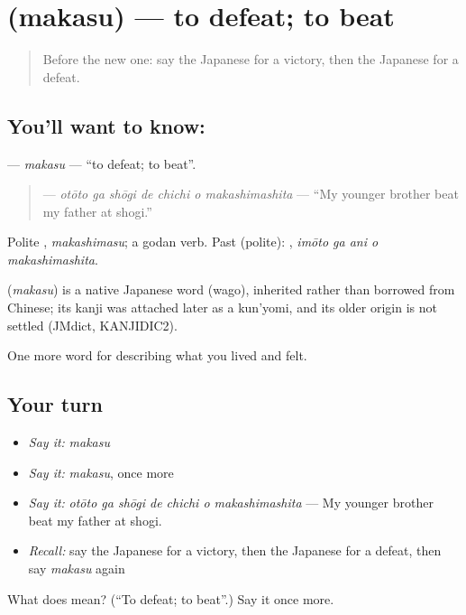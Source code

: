 \section[\texorpdfstring{\ja{まかす} (makasu)}{まかす (makasu)}]{ (makasu) — to defeat; to beat}

\label{lesson:JA-C506-makasu}



\begin{quote}
Before the new one: say the Japanese for a victory, then the Japanese for a defeat.
\end{quote}

\subsection*{You'll want to know: }
\textbf{} — \emph{makasu} — \textquotedblleft{}to defeat; to beat\textquotedblright{}.

\begin{quote}
\textbf{   } — \emph{otōto ga shōgi de chichi o makashimashita} — \textquotedblleft{}My younger brother beat my father at shogi.\textquotedblright{}
\end{quote}

Polite \textbf{}, \emph{makashimasu}; a godan verb. Past (polite): \textbf{  }, \emph{imōto ga ani o makashimashita}.

\begin{cousinweb}
\textbf{} (\emph{makasu}) is a native Japanese word (wago), inherited rather than borrowed from Chinese; its kanji was attached later as a kun'yomi, and its older origin is not settled (JMdict, KANJIDIC2).
\end{cousinweb}

\begin{grammarlens}[title={What you've built}]
One more word for describing what you lived and felt.
\end{grammarlens}

\subsection*{Your turn}
\begin{itemize}
\raggedright
  \item \emph{Say it:} \emph{makasu}
  \item \emph{Say it:} \emph{makasu}, once more
  \item \emph{Say it:} \emph{otōto ga shōgi de chichi o makashimashita} — My younger brother beat my father at shogi.
  \item \emph{Recall:} say the Japanese for a victory, then the Japanese for a defeat, then say \emph{makasu} again
\end{itemize}

\begin{tcolorbox}[breakable,colback=teal!4,colframe=teal!35!black,title={Before you move on}]
What does  mean? (\textquotedblleft{}To defeat; to beat\textquotedblright{}.) Say it once more.
\end{tcolorbox}
